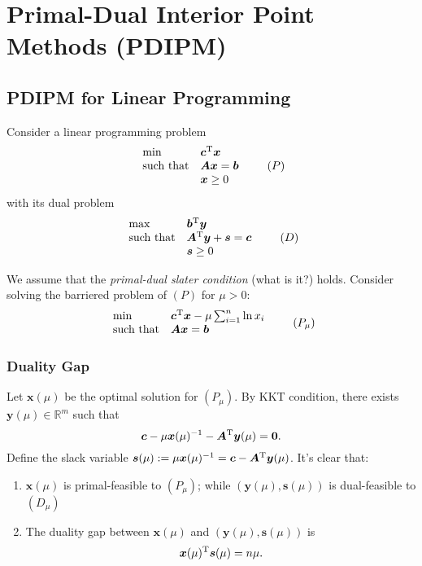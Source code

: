 \chapter{Primal-Dual Interior Point Methods (PDIPM)}

\section{PDIPM for Linear Programming}
Consider a linear programming problem
\begin{equation}
\begin{array}{ll}
\min&\bm c^{\mathrm T}\bm x\\
\mbox{such that}&\bm{Ax}=\bm b\\
&\bm x\ge0
\end{array}\qquad
(P)
\end{equation}
with its dual problem
\begin{equation}
\begin{array}{ll}
\max&\bm b^{\mathrm T}\bm y\\
\mbox{such that}&\bm{A}^{\mathrm T}\bm y+\bm s=\bm c\\
&\bm s\ge0
\end{array}\qquad
(D)
\end{equation}

We assume that the \emph{primal-dual slater condition} (what is it?) holds. Consider solving the barriered problem of $(P)$ for $\mu>0$:
\begin{equation}
\begin{array}{ll}
\min&\bm c^{\mathrm T}\bm x - \mu \sum_{i=1}^n\ln x_i\\
\mbox{such that}&\bm{Ax}=\bm b\\
\end{array}\qquad
(P_\mu)
\end{equation}

\subsection{Duality Gap}
Let $\bm x(\mu)$ be the optimal solution for $(P_\mu)$. By KKT condition, there exists $\bm y(\mu)\in\mathbb{R}^m$ such that
\[
\bm c - \mu\bm x(\mu)^{-1} - \bm A^{\mathrm T}\bm y(\mu) = \bm0.
\]
Define the slack variable $\bm s(\mu) : = \mu\bm x(\mu)^{-1} = \bm c -\bm A^{\mathrm T}\bm y(\mu)$. It's clear that:
\begin{enumerate}
\item
$\bm x(\mu)$ is primal-feasible to $(P_\mu)$; while $(\bm y(\mu),\bm s(\mu))$ is dual-feasible to $(D_\mu)$
\item
The duality gap between $\bm x(\mu)$ and $(\bm y(\mu),\bm s(\mu))$ is
\[
\bm x(\mu)^{\mathrm T} \bm s(\mu) = n\mu.
\]
\end{enumerate}

